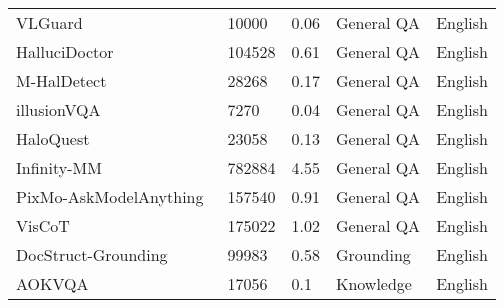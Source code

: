 \begin{table}[ht]
\begin{tabular}{l|l|l|l|l}
VLGuard~\cite{zong2023safety}                      & 10000  & 0.06       & General QA   & English         \\
HalluciDoctor~\cite{yu2023hallucidoctor}           & 104528 & 0.61       & General QA   & English         \\
M-HalDetect~\cite{gunjal2024detecting}             & 28268  & 0.17       & General QA   & English         \\
illusionVQA~\cite{shahgir2024illusionvqa}          & 7270   & 0.04       & General QA   & English         \\
HaloQuest~\cite{wang2024haloquest}                 & 23058  & 0.13       & General QA   & English         \\
Infinity-MM~\cite{gu2024infinitymm}                & 782884 & 4.55       & General QA   & English         \\
PixMo-AskModelAnything~\cite{deitke2024molmo}      & 157540 & 0.91       & General QA   & English         \\
VisCoT~\cite{shao2024visual}                       & 175022 & 1.02       & General QA   & English         \\
DocStruct-Grounding~\cite{hu2024docowl}            & 99983  & 0.58       & Grounding    & English         \\
AOKVQA~\cite{schwenk2022okvqa}                     & 17056  & 0.1        & Knowledge    & English         \\
\bottomrule
\end{tabular}
\end{table}



